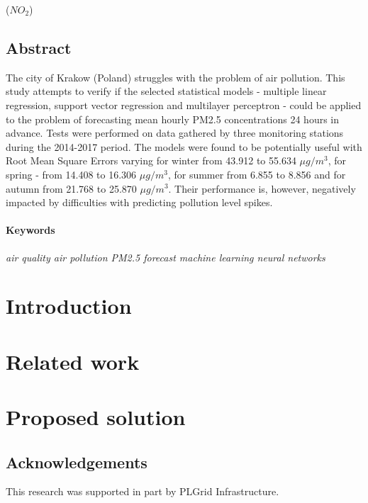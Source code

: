 \documentclass[12pt]{report}
\begin{document}

\tableofcontents

($NO_2$)\chapter*{Abstract}\label{chap:abstract}
The city of Krakow (Poland) struggles with the problem of air pollution. This study attempts to verify if the selected statistical models - multiple linear regression, support vector regression and multilayer perceptron - could be applied to the problem of forecasting mean hourly PM2.5 concentrations 24 hours in advance. Tests were performed on data gathered by three monitoring stations during the 2014-2017 period. The models were found to be potentially useful with Root Mean Square Errors varying for winter from 43.912 to 55.634 $\mu g/m^3$, for spring - from 14.408 to 16.306 $\mu g/m^3$, for summer from 6.855 to 8.856 and for autumn from 21.768 to 25.870 $\mu g/m^3$. Their performance is, however, negatively impacted by difficulties with predicting pollution level spikes.

\subsection*{Keywords}
\textit{air quality \quad air pollution \quad PM2.5 \quad forecast \quad machine learning \quad neural networks}

\part{Introduction}


\part{Related work}\label{part:related-work}


\part{Proposed solution}





\chapter*{Acknowledgements}
This research was supported in part by PLGrid Infrastructure.

\cleardoublepage %
\listoffigures


\cleardoublepage
{}


\end{document}
